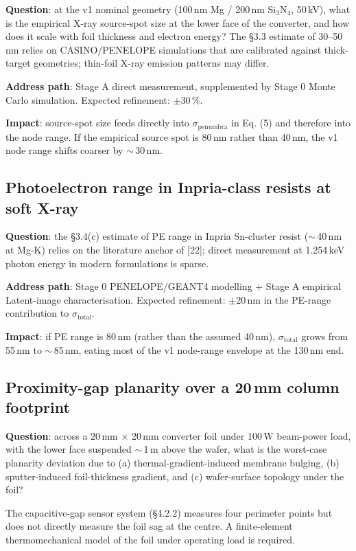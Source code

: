 \documentclass[11pt,letterpaper]{article}
\begin{document}
\textbf{Question}: at the v1 nominal geometry (100\,nm Mg / 200\,nm Si$_3$N$_4$, 50\,kV), what is the empirical X-ray source-spot size at the lower face of the converter, and how does it scale with foil thickness and electron energy? The \S 3.3 estimate of 30--50\,nm relies on CASINO/PENELOPE simulations that are calibrated against thick-target geometries; thin-foil X-ray emission patterns may differ.

\textbf{Address path}: Stage A direct measurement, supplemented by Stage 0 Monte Carlo simulation. Expected refinement: $\pm 30$\,\%.

\textbf{Impact}: source-spot size feeds directly into $\sigma_\text{penumbra}$ in Eq. (5) and therefore into the node range. If the empirical source spot is 80\,nm rather than 40\,nm, the v1 node range shifts coarser by $\sim$\,30\,nm.

\subsection{Photoelectron range in Inpria-class resists at soft X-ray}

\textbf{Question}: the \S 3.4(c) estimate of PE range in Inpria Sn-cluster resist ($\sim$\,40\,nm at Mg-K) relies on the literature anchor of [22]; direct measurement at 1.254\,keV photon energy in modern formulations is sparse.

\textbf{Address path}: Stage 0 PENELOPE/GEANT4 modelling + Stage A empirical Latent-image characterisation. Expected refinement: $\pm 20$\,nm in the PE-range contribution to $\sigma_\text{total}$.

\textbf{Impact}: if PE range is 80\,nm (rather than the assumed 40\,nm), $\sigma_\text{total}$ grows from 55\,nm to $\sim$\,85\,nm, eating most of the v1 node-range envelope at the 130\,nm end.

\subsection{Proximity-gap planarity over a 20\,mm column footprint}

\textbf{Question}: across a 20\,mm $\times$ 20\,mm converter foil under 100\,W beam-power load, with the lower face suspended $\sim$\,1\,\textmu m above the wafer, what is the worst-case planarity deviation due to (a) thermal-gradient-induced membrane bulging, (b) sputter-induced foil-thickness gradient, and (c) wafer-surface topology under the foil?

The capacitive-gap sensor system (\S 4.2.2) measures four perimeter points but does not directly measure the foil sag at the centre. A finite-element thermomechanical model of the foil under operating load is required.
\end{document}
